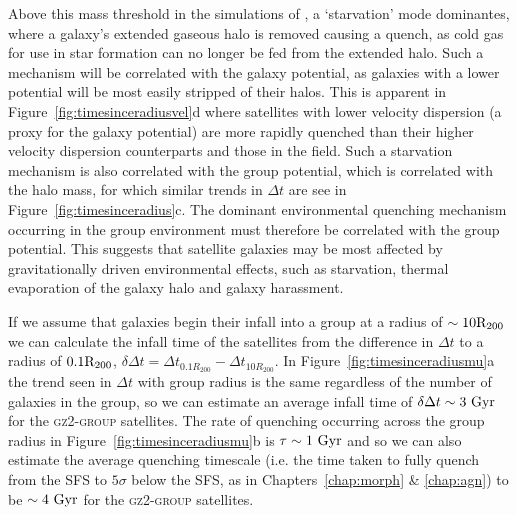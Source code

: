 Above this mass threshold in the simulations of \cite{fillingham16}, a `starvation' mode \citep{larson80, balogh00} dominantes, where a galaxy's extended gaseous halo is removed causing a quench, as cold gas for use in star formation can no longer be fed from the extended halo. Such a mechanism will be correlated with the galaxy potential, as galaxies with a lower potential will be most easily stripped of their halos. This is apparent in Figure~\ref{fig:timesinceradiusvel}d where satellites with lower velocity dispersion (a proxy for the galaxy potential) are more rapidly quenched than their higher velocity dispersion counterparts and those in the field. Such a starvation mechanism is also correlated with the group potential, which is correlated with the halo mass, for which similar trends in $\Delta t$ are see in Figure~\ref{fig:timesinceradius}c. The dominant environmental quenching mechanism occurring in the group environment must therefore be correlated with the group potential. This suggests that satellite galaxies may be most affected by gravitationally driven environmental effects, such as starvation, thermal evaporation of the galaxy halo and galaxy harassment. 

If we assume that galaxies begin their infall into a group at a radius of $\sim10\rm{R}_{200}$ we can calculate the infall time of the satellites from the difference in $\Delta t$ to a radius of $0.1 \rm{R}_{200}$, $\delta \Delta t = \Delta t_{0.1R_{200}} - \Delta t_{10 R_{200}}$. In Figure~\ref{fig:timesinceradiusmu}a the trend seen in $\Delta t$ with group radius is the same regardless of the number of galaxies in the group, so we can estimate an average infall time of $\delta \Delta t \sim 3 ~\rm{Gyr}$ for the \textsc{gz2-group} satellites. The rate of quenching occurring across the group radius in Figure~\ref{fig:timesinceradiusmu}b is $\tau \sim 1~\rm{Gyr}$ and so we can also estimate the average quenching timescale (i.e. the time taken to fully quench from the SFS to $5\sigma$ below the SFS, as in Chapters~\ref{chap:morph} \& \ref{chap:agn}) to be $\sim 4~\rm{Gyr}$ for the \textsc{gz2-group} satellites.

